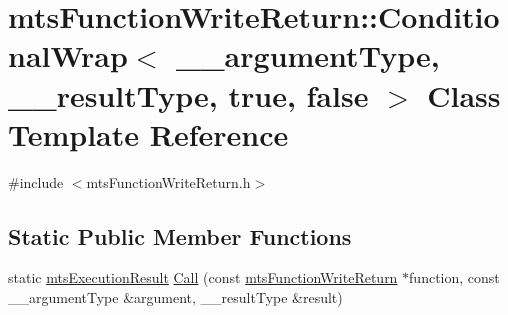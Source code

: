 \hypertarget{classmts_function_write_return_1_1_conditional_wrap_3_01____argument_type_00_01____result_type_00_01true_00_01false_01_4}{\section{mts\-Function\-Write\-Return\-:\-:Conditional\-Wrap$<$ \-\_\-\-\_\-argument\-Type, \-\_\-\-\_\-result\-Type, true, false $>$ Class Template Reference}
\label{classmts_function_write_return_1_1_conditional_wrap_3_01____argument_type_00_01____result_type_00_01true_00_01false_01_4}
}


{\ttfamily \#include $<$mts\-Function\-Write\-Return.\-h$>$}

\subsection*{Static Public Member Functions}
\begin{DoxyCompactItemize}
\item 
static \hyperlink{classmts_execution_result}{mts\-Execution\-Result} \hyperlink{classmts_function_write_return_1_1_conditional_wrap_3_01____argument_type_00_01____result_type_00_01true_00_01false_01_4_aa76751c394a1174d64cf4d80a58fa3eb}{Call} (const \hyperlink{classmts_function_write_return}{mts\-Function\-Write\-Return} $\ast$function, const \-\_\-\-\_\-argument\-Type \&argument, \-\_\-\-\_\-result\-Type \&result)
\end{DoxyCompactItemize}


